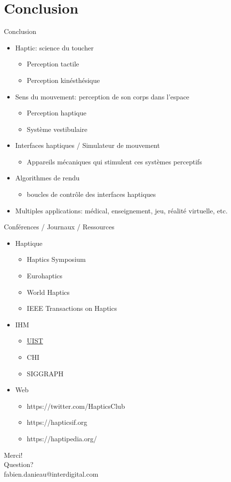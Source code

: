 \section{Conclusion} 
\begin{frame}{Conclusion}
	\begin{itemize}
		\item Haptic: science du toucher
		\begin{itemize}
		\item Perception tactile
		\item Perception kinésthésique
		\end{itemize}
		\item Sens du mouvement: perception de son corps dans l'espace
		\begin{itemize}
		\item Perception haptique
		\item Système vestibulaire
		\end{itemize}
		\item Interfaces haptiques / Simulateur de mouvement
		\begin{itemize}
		\item Appareils mécaniques qui stimulent ces systèmes perceptifs
\end{itemize}
		\item Algorithmes de rendu
		\begin{itemize}
		\item boucles de contrôle des interfaces haptiques
		\end{itemize}
		\item Multiples applications: médical, enseignement, jeu, réalité virtuelle, etc.
	\end{itemize}
\end{frame}	 


\begin{frame}{Conférences / Journaux / Ressources}
	\begin{itemize}
	\item Haptique
	\begin{itemize}
	\item Haptics Symposium
	\item Eurohaptics
	\item World Haptics
	\item IEEE Transactions on Haptics
	\end{itemize}
	\item IHM
	\begin{itemize}
	\item \href{https://www.youtube.com/user/acmsigchi}{UIST}
	\item CHI
	\item SIGGRAPH
	\end{itemize}
	\item Web
	\begin{itemize}
	\item https://twitter.com/HapticsClub
	\item https://hapticsif.org
	\item https://haptipedia.org/
	\end{itemize}
	\end{itemize}

\end{frame}

\begin{frame}[standout]
  Merci! \\
  Question? \\
  fabien.danieau@interdigital.com
\end{frame} 